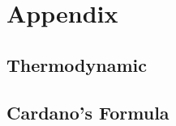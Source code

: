 \documentclass[a4paper,fleqn]{cas-dc}
\begin{document}
\clearpage \appendix \label{appendix}
\section{Appendix} 

\subsection{Thermodynamic}
 \label{CH: EOS}

%

%
%

%

\subsection{Cardano's Formula} \label{CH: Cardano}


%

%


\end{document}
